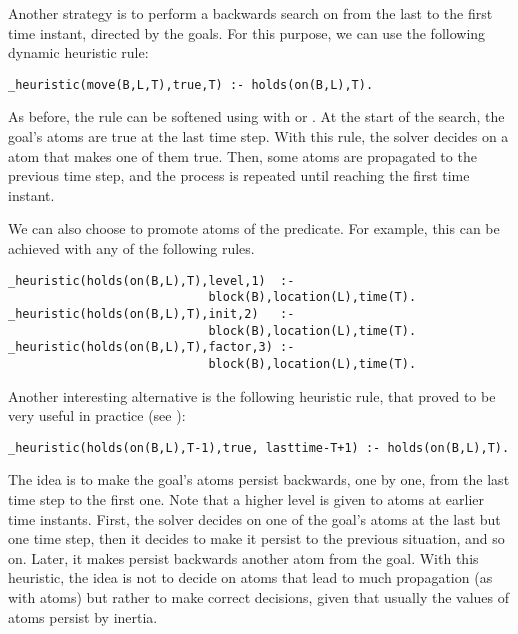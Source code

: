Another strategy is to perform a backwards search on  from the last to the
first time instant, directed by the goals. 
For this purpose, we can use the following dynamic heuristic rule: 
\begin{lstlisting}[basicstyle=\small\ttfamily,numbers=none]
_heuristic(move(B,L,T),true,T) :- holds(on(B,L),T).
\end{lstlisting}
As before, the rule can be softened using  with  or .
At the start of the search, the goal's  atoms are true at the last time step.
With this rule, the solver decides on a  atom that makes one of them true.
Then, some  atoms are propagated to the previous time step,
and the process is repeated until reaching the first time instant.

We can also choose to promote atoms of the  predicate.  
For example, this can be achieved with any of the  following rules.
\begin{lstlisting}[basicstyle=\small\ttfamily,numbers=none]
_heuristic(holds(on(B,L),T),level,1)  :- 
                            block(B),location(L),time(T).
_heuristic(holds(on(B,L),T),init,2)   :- 
                            block(B),location(L),time(T).
_heuristic(holds(on(B,L),T),factor,3) :- 
                            block(B),location(L),time(T).
\end{lstlisting}

Another interesting alternative is the following heuristic rule,  
that proved to be very useful in practice (see \cite{gekaotroscwa13a}):
\begin{lstlisting}[basicstyle=\small\ttfamily,numbers=none]
_heuristic(holds(on(B,L),T-1),true, lasttime-T+1) :- holds(on(B,L),T).
\end{lstlisting}
The idea is to make the goal's  atoms persist backwards, 
one by one, from the last time step to the first one.
Note that a higher level is given to atoms at earlier time instants.
First, the solver decides on one of the goal's  atoms at the last but one time step,
then it decides to make it persist to the previous situation, and so on.
Later, it makes persist backwards another  atom from the goal.
With this heuristic,
the idea is not to decide on atoms that lead to much propagation (as with  atoms)
but rather to make correct decisions, 
given that usually the values of  atoms persist by inertia.


